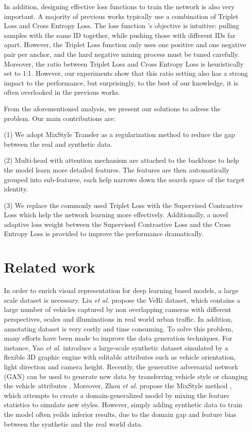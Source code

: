 \documentclass[10pt,twocolumn,letterpaper]{article}
\begin{document}
In addition, designing effective loss functions to train the network is also very important. A majority of previous works \cite{zheng2020beyond, 1st, 2nd, 3rd} typically use a combination of Triplet Loss and Cross Entropy Loss. The loss function 's objective is intuitive: pulling samples with the same ID together, while pushing those with different IDs far apart. However, the Triplet Loss function only uses one
positive and one negative pair per anchor, and the hard negative mining process must be tuned carefully. Moreover, the ratio between Triplet Loss and Cross Entropy Loss is heuristically set to 1:1. However, our experiments show that this ratio setting also has a strong impact to the performance, but surprisingly, to the best of our knowledge, it is often overlooked in the previous works. 

From the aforementioned analysis, we present our solutions to adress the problem. Our main contributions are:

(1) We adopt MixStyle Transfer \cite{mixstyle} as a regularization method to reduce the gap between the real and synthetic data.

(2) Multi-head with attention mechanism are attached to the backbone to help the model learn more detailed features. The features are then automatically grouped into sub-features, each help narrows down the search space of the target identity.

(3)  We replace the commonly used Triplet Loss with the Supervised Contrastive Loss \cite{supcon} which help the network learning more effectively. Additionally, a novel adaptive loss weight between the Supervised Contrastive Loss and the Cross Entropy Loss is provided to improve the performance dramatically.

\section{Related work}

In order to enrich visual representation for deep learning based models, a large scale dataset is necessary. Liu {\it et al.} \cite{veri} propose the VeRi dataset, which contains a large number of vehicles captured by non overlapping cameras with different perspectives, scales and illuminations in real world urban traffic. In addition, annotating dataset is very costly and time consuming. To solve this problem, many efforts have been made to improve the data generation techniques. For instance, Yao {\it et al. } \cite{vehicleX} introduce a large-scale synthetic dataset simulated by a flexible 3D graphic engine with editable attributes such as vehicle orientation, light direction and camera height. Recently, the generative adversarial network (GAN) can be used to generate new data by transferring vehicle style \cite{Deng_2018_CVPR, 8578114} or changing the vehicle attributes \cite{zheng2019joint}. Moreover, Zhou {\it et al.} propose the MixStyle method \cite{mixstyle}, which attempts to create a domain-generalized model by mixing the feature statistics to simulate new styles. However, simply adding synthetic data to train the model often yeilds inferior results, due to the domain gap and feature bias between the synthetic and the real world data.
\end{document}
